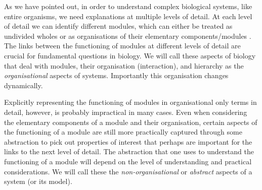 As we have pointed out, in order to understand complex biological systems, like
entire organisms, we need explanations at multiple levels of detail. At each
level of detail we can identify different modules, which can either be treated
as undivided wholes or as organisations of their elementary components/modules
\citep{varela_autopoiesis:_1974}. The links between the functioning of modules
at different levels of detail are crucial for fundamental questions in
biology. We will call these aspects of biology that deal with modules, their
organisation (interaction), and hierarchy as the \emph{organisational} aspects
of systems. Importantly this organisation changes dynamically.

Explicitly representing the functioning of modules in organisational only terms
in detail, however, is probably impractical in many cases. Even when considering
the elementary components of a module and their organisation, certain aspects of
the functioning of a module are still more practically captured through some
abstraction to pick out properties of interest that perhaps are important for
the links to the next level of detail. The abstraction that one uses to
understand the functioning of a module will depend on the level of understanding
and practical considerations.
We will call these the \emph{non-organisational} or
\emph{abstract} aspects of a system (or its model).

